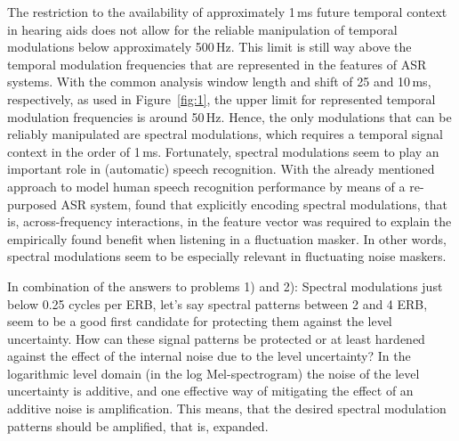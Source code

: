 \documentclass[10pt,a4paper,twocolumn]{article}
\begin{document}
The restriction to the availability of approximately 1\,ms future temporal context in hearing aids does not allow for the reliable  manipulation of temporal modulations below approximately 500\,Hz.
%
This limit is still way above the temporal modulation frequencies that are represented in the features of ASR systems.
%
With the common analysis window length and shift of 25 and 10\,ms, respectively, as used in Figure~\ref{fig:1}, the upper limit for represented temporal modulation frequencies is around 50\,Hz.
%
Hence, the only modulations that can be reliably manipulated are spectral modulations, which requires a temporal signal context in the order of 1\,ms.
%
Fortunately, spectral modulations seem to play an important role in (automatic) speech recognition.
%
With the already mentioned approach to model human speech recognition performance by means of a re-purposed ASR system, \cite{schaedler2016a} found that explicitly encoding spectral modulations, that is, across-frequency interactions, in the feature vector was required to explain the empirically found benefit when listening in a fluctuation masker.
%
In other words, spectral modulations seem to be especially relevant in fluctuating noise maskers.

In combination of the answers to problems 1) and 2): Spectral modulations just below 0.25 cycles per ERB, let's say spectral patterns between 2 and 4 ERB, seem to be a good first candidate for protecting them against the level uncertainty.
%
How can these signal patterns be protected or at least hardened against the effect of the internal noise due to the level uncertainty?
%
In the logarithmic level domain (in the log Mel-spectrogram) the noise of the level uncertainty is additive, and one effective way of mitigating the effect of an additive noise is amplification.
%
This means, that the desired spectral modulation patterns should be amplified, that is, expanded.
\end{document}
